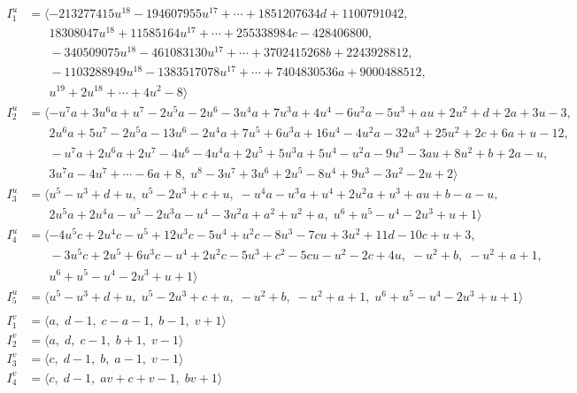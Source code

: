 \documentclass[1p]{elsarticle_modified}
\theoremstyle{definition}
\begin{document}
\begin{align*}
I^u_{1}&=\langle 
-213277415 u^{18}-194607955 u^{17}+\cdots+1851207634 d+1100791042,\\
\phantom{I^u_{1}}&\phantom{= \langle  }18308047 u^{18}+11585164 u^{17}+\cdots+255338984 c-428406800,\\
\phantom{I^u_{1}}&\phantom{= \langle  }-340509075 u^{18}-461083130 u^{17}+\cdots+3702415268 b+2243928812,\\
\phantom{I^u_{1}}&\phantom{= \langle  }-1103288949 u^{18}-1383517078 u^{17}+\cdots+7404830536 a+9000488512,\\
\phantom{I^u_{1}}&\phantom{= \langle  }u^{19}+2 u^{18}+\cdots+4 u^2-8\rangle \\
I^u_{2}&=\langle 
- u^7 a+3 u^6 a+u^7-2 u^5 a-2 u^6-3 u^4 a+7 u^3 a+4 u^4-6 u^2 a-5 u^3+a u+2 u^2+d+2 a+3 u-3,\\
\phantom{I^u_{2}}&\phantom{= \langle  }2 u^6 a+5 u^7-2 u^5 a-13 u^6-2 u^4 a+7 u^5+6 u^3 a+16 u^4-4 u^2 a-32 u^3+25 u^2+2 c+6 a+u-12,\\
\phantom{I^u_{2}}&\phantom{= \langle  }- u^7 a+2 u^6 a+2 u^7-4 u^6-4 u^4 a+2 u^5+5 u^3 a+5 u^4- u^2 a-9 u^3-3 a u+8 u^2+b+2 a- u,\\
\phantom{I^u_{2}}&\phantom{= \langle  }3 u^7 a-4 u^7+\cdots-6 a+8,\;u^8-3 u^7+3 u^6+2 u^5-8 u^4+9 u^3-3 u^2-2 u+2\rangle \\
I^u_{3}&=\langle 
u^5- u^3+d+u,\;u^5-2 u^3+c+u,\;- u^4 a- u^3 a+u^4+2 u^2 a+u^3+a u+b- a- u,\\
\phantom{I^u_{3}}&\phantom{= \langle  }2 u^5 a+2 u^4 a- u^5-2 u^3 a- u^4-3 u^2 a+a^2+u^2+a,\;u^6+u^5- u^4-2 u^3+u+1\rangle \\
I^u_{4}&=\langle 
-4 u^5 c+2 u^4 c- u^5+12 u^3 c-5 u^4+u^2 c-8 u^3-7 c u+3 u^2+11 d-10 c+u+3,\\
\phantom{I^u_{4}}&\phantom{= \langle  }-3 u^5 c+2 u^5+6 u^3 c- u^4+2 u^2 c-5 u^3+c^2-5 c u- u^2-2 c+4 u,\;- u^2+b,\;- u^2+a+1,\\
\phantom{I^u_{4}}&\phantom{= \langle  }u^6+u^5- u^4-2 u^3+u+1\rangle \\
I^u_{5}&=\langle 
u^5- u^3+d+u,\;u^5-2 u^3+c+u,\;- u^2+b,\;- u^2+a+1,\;u^6+u^5- u^4-2 u^3+u+1\rangle \\
\\
I^v_{1}&=\langle 
a,\;d-1,\;c- a-1,\;b-1,\;v+1\rangle \\
I^v_{2}&=\langle 
a,\;d,\;c-1,\;b+1,\;v-1\rangle \\
I^v_{3}&=\langle 
c,\;d-1,\;b,\;a-1,\;v-1\rangle \\
I^v_{4}&=\langle 
c,\;d-1,\;a v+c+v-1,\;b v+1\rangle \\
\end{align*}
\end{document}
